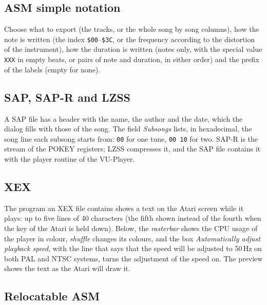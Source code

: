 \subsection{ASM simple notation}


Choose what to export (the tracks, or the whole song by song columns), how the note is written (the index \texttt{\$00}--\texttt{\$3C}, or the
frequency according to the distortion of the instrument), how the duration is written (notes only, with the special value
\texttt{XXX} in empty beats, or pairs of note and duration, in either order) and the prefix of the labels (empty for none).

\subsection{SAP, SAP-R and LZSS}


A SAP file has a header with the name, the author and the date, which the dialog fills with those of the song. The field
\emph{Subsongs} lists, in hexadecimal, the song line each subsong starts from: \texttt{00} for one tune, \texttt{00 10} for two. SAP-R is the stream of
the POKEY registers; LZSS compresses it, and the SAP file contains it with the player routine of the VU-Player.

\subsection{XEX}


The program an XEX file contains shows a text on the Atari screen while it plays: up to five lines of 40 characters (the fifth shown
instead of the fourth when the  key of the Atari is held down). Below, the \emph{rasterbar} shows the CPU usage of the player
in colour, \emph{shuffle} changes its colours, and the box \emph{Automatically adjust playback speed}, with the line that says that the speed will be
adjusted to 50\,Hz on both PAL and NTSC systems, turns the adjustment of the speed on. The preview shows
the text as the Atari will draw it.

\subsection{Relocatable ASM}

